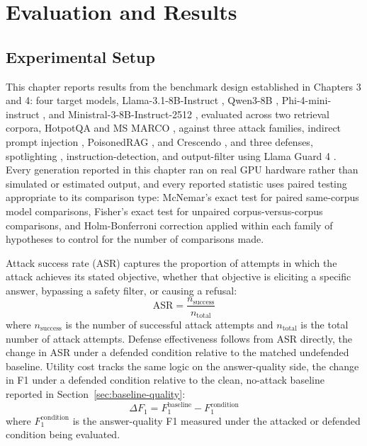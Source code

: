 \chapter{Evaluation and Results}

\section{Experimental Setup}

This chapter reports results from the benchmark design established in
Chapters 3 and 4: four target models, Llama-3.1-8B-Instruct
\citep{grattafiori2024llama3}, Qwen3-8B \citep{yang2025qwen3},
Phi-4-mini-instruct \citep{abouelenin2025phi4mini}, and
Ministral-3-8B-Instruct-2512 \citep{mistralai2025ministral3}, evaluated
across two retrieval corpora, HotpotQA \citep{yang2018hotpotqa} and MS
MARCO \citep{nguyen2016msmarco}, against three attack families, indirect
prompt injection \citep{greshake2023not}, PoisonedRAG
\citep{zou2025poisonedrag}, and Crescendo \citep{russinovich2025great},
and three defenses, spotlighting \citep{hines2024defending},
instruction-detection, and output-filter using Llama Guard 4
\citep{metaai2025llamaguard4}. Every generation reported in this chapter
ran on real GPU hardware rather than simulated or estimated output, and
every reported statistic uses paired testing appropriate to its
comparison type: McNemar's exact test for paired same-corpus model
comparisons, Fisher's exact test for unpaired corpus-versus-corpus
comparisons, and Holm-Bonferroni correction applied within each family
of hypotheses to control for the number of comparisons made.

Attack success rate (ASR) captures the proportion of attempts in which
the attack achieves its stated objective, whether that objective is
eliciting a specific answer, bypassing a safety filter, or causing a
refusal:
$$
\mathrm{ASR} = \frac{n_{\text{success}}}{n_{\text{total}}}
$$
where $n_{\text{success}}$ is the number of successful attack attempts
and $n_{\text{total}}$ is the total number of attack attempts. Defense
effectiveness follows from ASR directly, the change in ASR under a
defended condition relative to the matched undefended baseline. Utility
cost tracks the same logic on the answer-quality side, the change in
F1 under a defended condition relative to the clean, no-attack baseline
reported in Section~\ref{sec:baseline-quality}:
$$
\Delta F_1 = F_1^{\text{baseline}} - F_1^{\text{condition}}
$$
where $F_1^{\text{condition}}$ is the answer-quality F1 measured under
the attacked or defended condition being evaluated.

